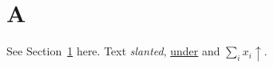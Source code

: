 \documentclass{article}
\begin{document}
\section{A}\label{s:a}
See Section~\ref{s:a} here. Text {\it slanted}, \uline{under} and $\sum_i x_i \uparrow$.
\end{document}
